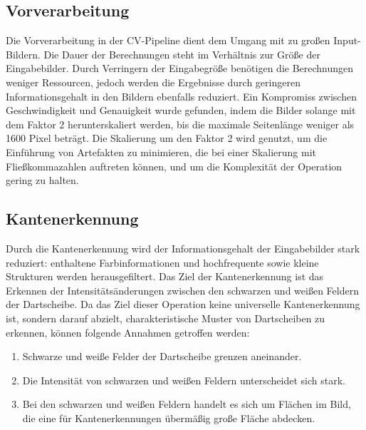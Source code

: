 \subsection{Vorverarbeitung}
\label{sec:impl:cv:preprocessing}

Die Vorverarbeitung in der CV-Pipeline dient dem Umgang mit zu großen Input-Bildern. Die Dauer der Berechnungen steht im Verhältnis zur Größe der Eingabebilder. Durch Verringern der Eingabegröße benötigen die Berechnungen weniger Ressourcen, jedoch werden die Ergebnisse durch geringeren Informationsgehalt in den Bildern ebenfalls reduziert. Ein Kompromiss zwischen Geschwindigkeit und Genauigkeit wurde gefunden, indem die Bilder solange mit dem Faktor 2 herunterskaliert werden, bis die maximale Seitenlänge weniger als 1600 Pixel beträgt. Die Skalierung um den Faktor 2 wird genutzt, um die Einführung von Artefakten zu minimieren, die bei einer Skalierung mit Fließkommazahlen auftreten können, und um die Komplexität der Operation gering zu halten.

\subsection{Kantenerkennung}
\label{sec:impl:cv:edges}

Durch die Kantenerkennung wird der Informationsgehalt der Eingabebilder stark reduziert: enthaltene Farbinformationen und hochfrequente sowie kleine Strukturen werden herausgefiltert. Das Ziel der Kantenerkennung ist das Erkennen der Intensitätsänderungen zwischen den schwarzen und weißen Feldern der Dartscheibe. Da das Ziel dieser Operation keine universelle Kantenerkennung ist, sondern darauf abzielt, charakteristische Muster von Dartscheiben zu erkennen, können folgende Annahmen getroffen werden:

\begin{enumerate}
    \item Schwarze und weiße Felder der Dartscheibe grenzen aneinander.
    \item Die Intensität von schwarzen und weißen Feldern unterscheidet sich stark.
    \item Bei den schwarzen und weißen Feldern handelt es sich um Flächen im Bild, die eine für Kantenerkennungen übermäßig große Fläche abdecken.
\end{enumerate}


